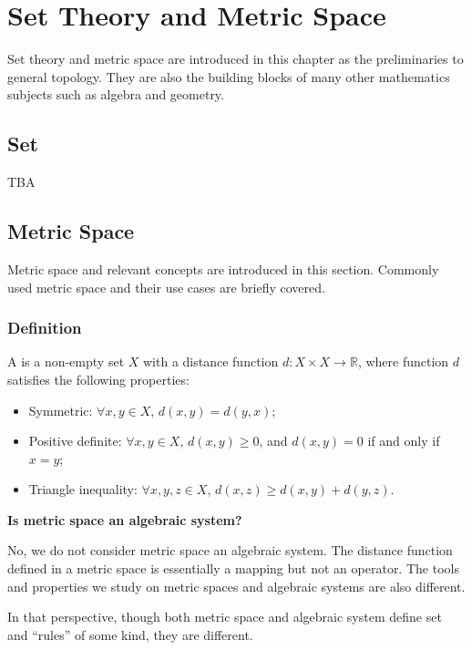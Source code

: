 \chapter{Set Theory and Metric Space}

Set theory and metric space are introduced in this chapter as the preliminaries to general topology. They are also the building blocks of many other mathematics subjects such as algebra and geometry.

\section{Set}

TBA

\section{Metric Space}

Metric space and relevant concepts are introduced in this section. Commonly used metric space and their use cases are briefly covered.

\subsection{Definition}

A  is a non-empty set $X$ with a distance function $d: X \times X \to \mathbb{R}$, where function $d$ satisfies the following properties:
\begin{itemize}
	\item Symmetric: $\forall x, y \in X$, $d(x,y)=d(y,x)$;
	\item Positive definite: $\forall x, y \in X$, $d(x,y)\geq 0$, and $d(x,y)=0$ if and only if $x=y$;
	\item Triangle inequality: $\forall x, y, z \in X$, $d(x,z)\geq d(x,y) + d(y, z)$.
\end{itemize}

\begin{mdframed}
\noindent \textbf{Is metric space an algebraic system?}

No, we do not consider metric space an algebraic system. The distance function defined in a metric space is essentially a mapping but not an operator. The tools and properties we study on metric spaces and algebraic systems are also different.

In that perspective, though both metric space and algebraic system define set and ``rules'' of some kind, they are different.

\end{mdframed}

